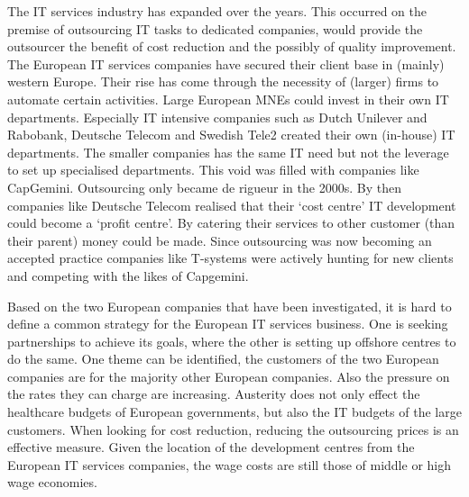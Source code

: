 The IT services industry has expanded over the years.
This occurred on the premise of outsourcing IT tasks to dedicated companies, would provide the outsourcer the benefit of cost reduction and the possibly of quality improvement.\\
The European IT services companies have secured their client base in (mainly) western Europe.
Their rise has come through the necessity of (larger) firms to automate certain activities. 
Large European \glspl{MNE} could invest in their own IT departments.
Especially IT intensive companies such as Dutch Unilever and Rabobank, Deutsche Telecom and Swedish Tele2 created their own (in-house) IT departments.
The smaller companies has the same IT need but not the leverage to set up specialised departments.
This void was filled with companies like CapGemini.
Outsourcing only became de rigueur in the 2000s.
By then companies like Deutsche Telecom realised that their `cost centre' IT development could become a `profit centre'.
By catering their services to other customer (than their parent) money could be made.
Since outsourcing was now becoming an accepted practice companies like T-systems were actively hunting for new clients and competing with the likes of Capgemini.

Based on the two European companies that have been investigated, it is hard to define a common strategy for the European IT services business.
One is seeking partnerships to achieve its goals, where the other is setting up offshore centres to do the same.
One theme can be identified, the customers of the two European companies are for the majority other European companies.
Also the pressure on the rates they can charge are increasing.
Austerity does not only effect the healthcare budgets of European governments, but also the IT budgets of the large customers.
When looking for cost reduction, reducing the outsourcing prices is an effective measure. 
Given the location of the development centres from the European IT services companies, the wage costs are still those of middle or high wage economies.


